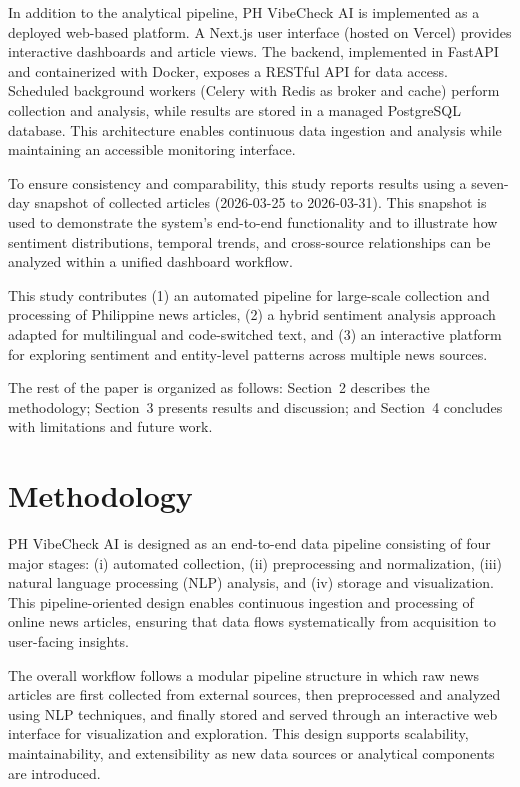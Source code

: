 \documentclass[sigconf, nonacm]{acmart}
\begin{document}
In addition to the analytical pipeline, PH VibeCheck AI is implemented as a deployed web-based platform. A Next.js user interface (hosted on Vercel) provides interactive dashboards and article views. The backend, implemented in FastAPI and containerized with Docker, exposes a RESTful API for data access. Scheduled background workers (Celery with Redis as broker and cache) perform collection and analysis, while results are stored in a managed PostgreSQL database. This architecture enables continuous data ingestion and analysis while maintaining an accessible monitoring interface.

To ensure consistency and comparability, this study reports results using a seven-day snapshot of collected articles (2026-03-25 to 2026-03-31). This snapshot is used to demonstrate the system’s end-to-end functionality and to illustrate how sentiment distributions, temporal trends, and cross-source relationships can be analyzed within a unified dashboard workflow.

This study contributes (1) an automated pipeline for large-scale collection and processing of Philippine news articles, (2) a hybrid sentiment analysis approach adapted for multilingual and code-switched text, and (3) an interactive platform for exploring sentiment and entity-level patterns across multiple news sources.

The rest of the paper is organized as follows: Section~2 describes the methodology; Section~3 presents results and discussion; and Section~4 concludes with limitations and future work.

\section{Methodology}
PH VibeCheck AI is designed as an end-to-end data pipeline consisting of four major stages: (i) automated collection, (ii) preprocessing and normalization, (iii) natural language processing (NLP) analysis, and (iv) storage and visualization. This pipeline-oriented design enables continuous ingestion and processing of online news articles, ensuring that data flows systematically from acquisition to user-facing insights.

The overall workflow follows a modular pipeline structure in which raw news articles are first collected from external sources, then preprocessed and analyzed using NLP techniques, and finally stored and served through an interactive web interface for visualization and exploration. This design supports scalability, maintainability, and extensibility as new data sources or analytical components are introduced.
\end{document}

